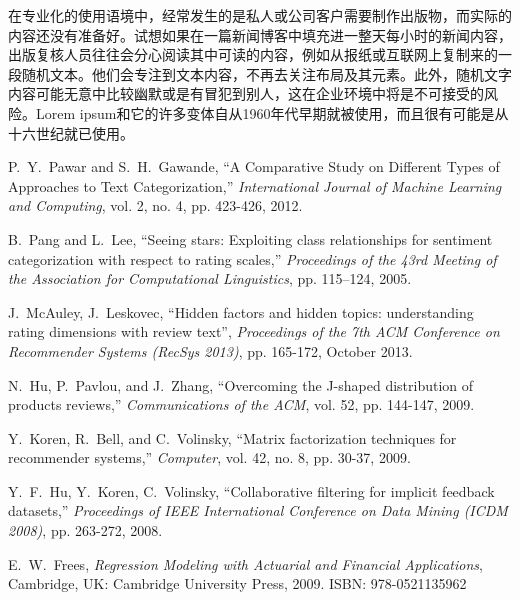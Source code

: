 \documentclass[a4paper,twoside]{article}
\begin{document}
\begin{spacing}{1.2}
在专业化的使用语境中，经常发生的是私人或公司客户需要制作出版物，而实际的内容还没有准备好。试想如果在一篇新闻博客中填充进一整天每小时的新闻内容，出版复核人员往往会分心阅读其中可读的内容，例如从报纸或互联网上复制来的一段随机文本。他们会专注到文本内容，不再去关注布局及其元素。此外，随机文字内容可能无意中比较幽默或是有冒犯到别人，这在企业环境中将是不可接受的风险。Lorem ipsum和它的许多变体自从1960年代早期就被使用，而且很有可能是从十六世纪就已使用。

\newpage
\begin{thebibliography}{00}
	
	
	P.~Y.~Pawar and S.~H.~Gawande, ``A Comparative Study on Different Types of Approaches to Text Categorization,'' \textit{International Journal of Machine Learning and Computing}, vol. 2, no. 4, pp. 423-426, 2012.
	
	B.~Pang and L.~Lee, ``Seeing stars: Exploiting class relationships for sentiment categorization with respect to rating scales,'' \textit{Proceedings of the 43rd Meeting of the Association for Computational Linguistics}, pp. 115–124, 2005.
	
	J.~McAuley, J.~Leskovec, ``Hidden factors and hidden topics: understanding rating dimensions with review text'', \textit{Proceedings of the 7th ACM Conference on Recommender Systems (RecSys 2013)}, pp. 165-172, October 2013.
	
	N.~Hu, P.~Pavlou, and J.~Zhang, ``Overcoming the J-shaped distribution of products reviews,'' \textit{Communications of the ACM}, vol. 52, pp. 144-147, 2009. 
	
	Y.~Koren, R.~Bell, and C.~Volinsky, ``Matrix factorization techniques for recommender systems,'' \textit{Computer}, vol. 42, no. 8, pp. 30-37, 2009.
	
	Y.~F.~Hu, Y.~Koren, C.~Volinsky, ``Collaborative filtering for implicit feedback datasets,'' \textit{Proceedings of IEEE International Conference on Data Mining (ICDM 2008)}, pp. 263-272, 2008.
	
	E.~W.~Frees, \textit{Regression Modeling with Actuarial and Financial Applications}, Cambridge, UK: Cambridge University Press, 2009. ISBN: 978-0521135962
	
\end{thebibliography}



\end{spacing}
\end{document}
